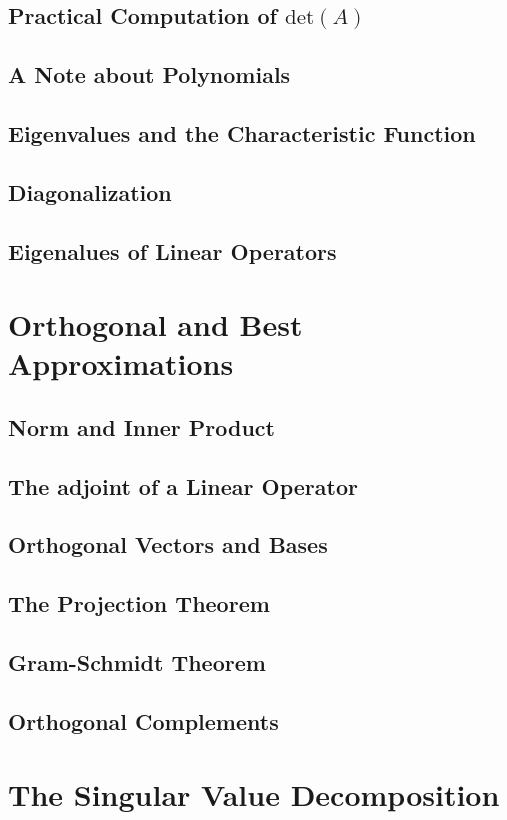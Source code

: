 \documentclass{book}
\theoremstyle{definition}
\theoremstyle{remark}
\begin{document}
\subsection{Practical Computation of $\text{det}(A)$}
\subsection{A Note about Polynomials}
\subsection{Eigenvalues and the Characteristic Function}
\subsection{Diagonalization}
\subsection{Eigenalues of Linear Operators}

\newpage
\section{Orthogonal and Best Approximations}
\subsection{Norm and Inner Product}
\subsection{The adjoint of a Linear Operator}
\subsection{Orthogonal Vectors and Bases}
\subsection{The Projection Theorem}
\subsection{Gram-Schmidt Theorem}
\subsection{Orthogonal Complements}

\newpage
\section{The Singular Value Decomposition}
\end{document}
